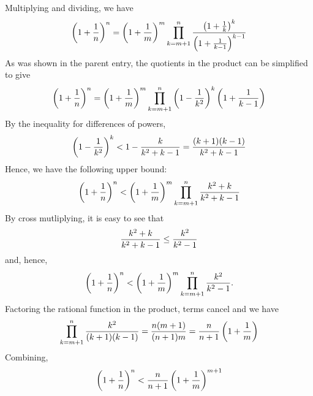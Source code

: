 \documentclass[12pt]{article}
\begin{document}
Multiplying and dividing, we have
\[ \left( 1 + {1 \over n} \right)^n = \left( 1 + {1 \over m} \right)^m
\prod_{k=m+1}^n { \left( 1 + {1 \over k} \right)^k \over \left( 1 + {1
\over k-1} \right)^{k-1}} \]
As was shown in the parent entry, the quotients in the product can
be simplified to give
\[ \left( 1 + {1 \over n} \right)^n = \left( 1 + {1 \over m} \right)^m
\prod_{k=m+1}^n \left( 1 - {1 \over k^2} \right)^k \left( 1 + {1 \over
k-1} \right) \]
By the inequality for differences of powers,
\[ \left( 1 - {1 \over k^2} \right)^k < 1 - {k \over k^2 + k - 1} 
= {(k+1) (k-1) \over k^2 + k - 1} \]
Hence, we have the following upper bound:
\[ \left( 1 + {1 \over n} \right)^n < \left( 1 + {1 \over m} \right)^m
\prod_{k=m+1}^n {k^2 + k \over k^2 + k - 1} \]
By cross mutliplying, it is easy to see that
\[ {k^2 + k \over k^2 + k - 1} \le {k^2 \over k^2 - 1} \]
and, hence,
\[ \left( 1 + {1 \over n} \right)^n < \left( 1 + {1 \over m} \right)^m
\prod_{k=m+1}^n {k^2 \over k^2 - 1}. \]
Factoring the rational function in the product, terms cancel and we
have
\[ \prod_{k=m+1}^n {k^2 \over (k+1)(k-1)} = {n (m+1) \over (n+1)  m}
= {n \over n+1} \left( 1 + {1 \over m} \right) \]
Combining,
\[ \left( 1 + {1 \over n} \right)^n < {n \over n+1} \left( 1
+ {1 \over m} \right)^{m+1} \]
\end{document}
